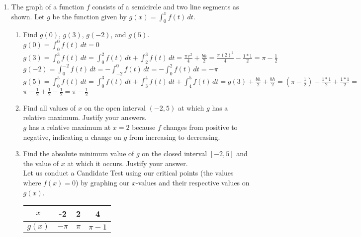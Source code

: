 \documentclass[10pt, letterpaper]{report}
\begin{document}
\begin{enumerate}
\begin{enumerate}
  \end{enumerate}
  \pagebreak
  \item{The graph of a function $f$ consists of a semicircle and two line segments as shown. Let $g$ be the function given by $g(x)=\int_{0}^{x}{f(t)}\,dt$}.
  \begin{enumerate}
    \item{Find $g(0)$, $g(3)$, $g(-2)$, and $g(5)$.} \\

      $g(0)=\int_{0}^{0}{f(t)}\,dt=0$ \\

      $g(3)=\int_{0}^{3}{f(t)}\,dt=
      \int_{0}^{2}{f(t)}\,dt + \int_{2}^{3}{f(t)}\,dt= \frac{\pi\,r^{2}}{4} + \frac{bh}{2} =
      \frac{\pi\,(2)^{2}}{4} - \frac{1*1}{2} =
      \pi - \frac{1}{2}$ \\

      $g(-2)=\int_{0}^{-2}{f(t)}\,dt=
      -\int_{-2}^{0}{f(t)}\,dt=
      -\int_{0}^{2}{f(t)}\,dt=-\pi$ \\

      $g(5)=\int_{0}^{5}{f(t)}\,dt=
      \int_{0}^{3}{f(t)}\,dt + \int_{3}^{4}{f(t)}\,dt + \int_{4}^{5}{f(t)}\,dt=
      g(3) + \frac{bh}{2} + \frac{bh}{2} =
      \left( \pi - \frac{1}{2} \right) - \frac{1*1}{2} + \frac{1*1}{2}= $ \\

      $\pi - \frac{1}{2} + \frac{1}{2} - \frac{1}{2} = \pi - \frac{1}{2}$ \\

    \item{Find all values of $x$ on the open interval $(-2,5)$ at which $g$ has a relative maximum. Justify your answers.} \\

      $g$ has a relative maximum at $x=2$ because $f$ changes from positive to negative, indicating a change on $g$ from increasing to decreasing. \\

    \item{Find the absolute minimum value of $g$ on the closed interval $[-2,5]$ and the value of $x$ at which it occurs. Justify your answer.} \\

      Let us conduct a Candidate Test using our critical points (the values where $f(x)=0$) by graphing our $x$-values and their respective values on $g(x)$.

      \begin{center}
        \begin{tabular}{| c | c | c | c |}
          \hline
          $x$ & -2 & 2 & 4 \\
          \hline
          $g(x)$ & $-\pi$ & $\pi$ & $\pi - 1$ \\
          \hline
        \end{tabular}
      \end{center}


\end{enumerate}
\end{enumerate}
\end{document}
